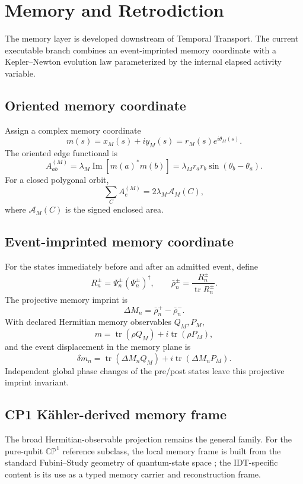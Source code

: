 \chapter{Memory and Retrodiction}

The memory layer is developed downstream of Temporal Transport. The current executable branch combines an event-imprinted memory coordinate with a Kepler--Newton evolution law parameterized by the internal elapsed activity variable.

\section{Oriented memory coordinate}

Assign a complex memory coordinate
\[
m(s)=x_M(s)+iy_M(s)=r_M(s)e^{i\theta_M(s)}.
\]
The oriented edge functional is
\[
\boxed{
A^{(M)}_{ab}
=\lambda_M\operatorname{Im}[m(a)^*m(b)]
=\lambda_M r_a r_b\sin(\theta_b-\theta_a).
}
\]
For a closed polygonal orbit,
\[
\sum_C A^{(M)}_e
=2\lambda_M\mathcal A_M(C),
\]
where \(\mathcal A_M(C)\) is the signed enclosed area.

\section{Event-imprinted memory coordinate}

For the states immediately before and after an admitted event, define
\[
R_n^\pm=\Psi_n^\pm(\Psi_n^\pm)^\dagger,
\qquad
\bar\rho_n^\pm=\frac{R_n^\pm}{\operatorname{tr}R_n^\pm}.
\]
The projective memory imprint is
\[
\boxed{\Delta M_n=\bar\rho_n^+-\bar\rho_n^-}.
\]
With declared Hermitian memory observables \(Q_M,P_M\),
\[
m=\operatorname{tr}(\rho Q_M)+i\operatorname{tr}(\rho P_M),
\]
and the event displacement in the memory plane is
\[
\boxed{
\delta m_n
=\operatorname{tr}(\Delta M_nQ_M)
+i\operatorname{tr}(\Delta M_nP_M).
}
\]
Independent global phase changes of the pre/post states leave this projective imprint invariant.

\section{CP1 K\"ahler-derived memory frame}

The broad Hermitian-observable projection remains the general family. For the pure-qubit \(\mathbb{CP}^1\) reference subclass, the local memory frame is built from the standard Fubini--Study geometry of quantum-state space \cite{ProvostVallee1980}; the IDT-specific content is its use as a typed memory carrier and reconstruction frame.

